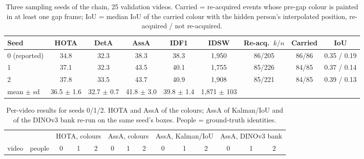 \documentclass{article} %
\newcommand{\rev}[1]{{\color{blue}#1}}
\begin{document}
\begin{table}[h]
\caption{\rev{Three sampling seeds of the chain, 25 validation videos. Carried = re-acquired
events whose pre-gap colour is painted in at least one gap frame; IoU = median IoU of the
carried colour with the hidden person's interpolated position, re-acquired / not
re-acquired.}}
\label{tab:seeds}
\begin{center}
\scriptsize
\setlength{\tabcolsep}{3pt}
\begin{tabular}{lcccccccc}
\toprule
\rev{Seed} & \rev{HOTA} & \rev{DetA} & \rev{AssA} & \rev{IDF1} & \rev{IDSW} & \rev{Re-acq.\ $k/n$} & \rev{Carried} & \rev{IoU} \\
\midrule
\rev{0 (reported)} & \rev{34.8} & \rev{32.3} & \rev{38.3} & \rev{38.3} & \rev{1,950} & \rev{86/205} & \rev{86/86} & \rev{0.35 / 0.19} \\
\rev{1} & \rev{37.1} & \rev{32.3} & \rev{43.5} & \rev{40.1} & \rev{1,755} & \rev{85/226} & \rev{84/85} & \rev{0.37 / 0.14} \\
\rev{2} & \rev{37.8} & \rev{33.5} & \rev{43.7} & \rev{40.9} & \rev{1,908} & \rev{85/221} & \rev{84/85} & \rev{0.39 / 0.13} \\
\midrule
\rev{mean $\pm$ sd} & \rev{36.5 $\pm$ 1.6} & \rev{32.7 $\pm$ 0.7} & \rev{41.8 $\pm$ 3.0} & \rev{39.8 $\pm$ 1.4} & \rev{1,871 $\pm$ 103} & & & \\
\bottomrule
\end{tabular}
\end{center}
\end{table}

\begin{table}[h]
\caption{\rev{Per-video results for seeds 0/1/2. HOTA and AssA of the colours; AssA of
Kalman/IoU and of the DINOv3 bank re-run on the same seed's boxes. People = ground-truth
identities.}}
\label{tab:seedsvideo}
\begin{center}
\scriptsize
\setlength{\tabcolsep}{2.5pt}
\begin{tabular}{lc|ccc|ccc|ccc|ccc}
\toprule
 & & \multicolumn{3}{c|}{\rev{HOTA, colours}} & \multicolumn{3}{c|}{\rev{AssA, colours}} & \multicolumn{3}{c|}{\rev{AssA, Kalman/IoU}} & \multicolumn{3}{c}{\rev{AssA, DINOv3 bank}} \\
\rev{video} & \rev{people} & 0 & 1 & 2 & 0 & 1 & 2 & 0 & 1 & 2 & 0 & 1 & 2 \\
\midrule

\end{tabular}
\end{center}
\end{table}
\end{document}
